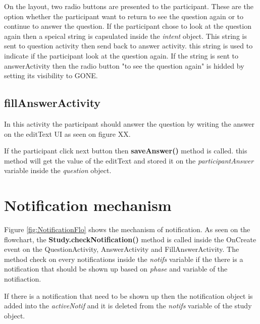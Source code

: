 On the layout, two radio buttons are presented to the participant. These are the option whether the participant want to return to see the question again or to continue
 to answer the question.
If the participant chose to look at the question again then a speical string is capsulated inside the \textit{intent} object.
This string is sent to question activity then send back to answer activity. this string is used to indicate if the participant look at the question again.
If the string is sent to answerActivity then the radio button "to see the question again" is hidded by setting its visibility to GONE.


\subsection{fillAnswerActivity}
In this activity the participant should answer the question by writing the answer on the editText UI as seen on figure XX.

If the participant click next button then \textbf{saveAnswer()} method is called. this method will get the value of the editText
and stored it on the \textit{participantAnswer} variable inside the \textit{question} object.


\section{Notification mechanism}
Figure \ref{fig:NotificationFlo} shows the mechanism of notification.
As seen on the flowchart, the \textbf{Study.checkNotification()} method is called inside
the OnCreate event on the QuestionActivity, AnswerActivity and FillAnswerActivity.
The method check on every notifications inside the \textit{notifs} variable if the there is a notification that should be shown up based on \textit{phase} and  variable of the notifiaction.

If there  is a notification that need to be shown up then the notification object is added into the \textit{activeNotif} and it is deleted from the \textit{notifs} variable of the study object.

